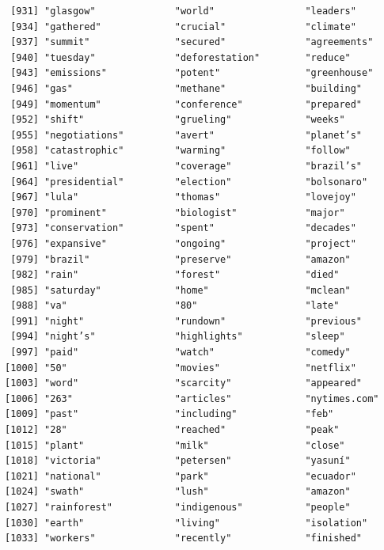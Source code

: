 \documentclass[
  letterpaper,
  DIV=11,
  numbers=noendperiod]{scrartcl}
\begin{document}
\begin{verbatim}
 [931] "glasgow"              "world"                "leaders"             
 [934] "gathered"             "crucial"              "climate"             
 [937] "summit"               "secured"              "agreements"          
 [940] "tuesday"              "deforestation"        "reduce"              
 [943] "emissions"            "potent"               "greenhouse"          
 [946] "gas"                  "methane"              "building"            
 [949] "momentum"             "conference"           "prepared"            
 [952] "shift"                "grueling"             "weeks"               
 [955] "negotiations"         "avert"                "planet’s"            
 [958] "catastrophic"         "warming"              "follow"              
 [961] "live"                 "coverage"             "brazil’s"            
 [964] "presidential"         "election"             "bolsonaro"           
 [967] "lula"                 "thomas"               "lovejoy"             
 [970] "prominent"            "biologist"            "major"               
 [973] "conservation"         "spent"                "decades"             
 [976] "expansive"            "ongoing"              "project"             
 [979] "brazil"               "preserve"             "amazon"              
 [982] "rain"                 "forest"               "died"                
 [985] "saturday"             "home"                 "mclean"              
 [988] "va"                   "80"                   "late"                
 [991] "night"                "rundown"              "previous"            
 [994] "night’s"              "highlights"           "sleep"               
 [997] "paid"                 "watch"                "comedy"              
[1000] "50"                   "movies"               "netflix"             
[1003] "word"                 "scarcity"             "appeared"            
[1006] "263"                  "articles"             "nytimes.com"         
[1009] "past"                 "including"            "feb"                 
[1012] "28"                   "reached"              "peak"                
[1015] "plant"                "milk"                 "close"               
[1018] "victoria"             "petersen"             "yasuní"              
[1021] "national"             "park"                 "ecuador"             
[1024] "swath"                "lush"                 "amazon"              
[1027] "rainforest"           "indigenous"           "people"              
[1030] "earth"                "living"               "isolation"           
[1033] "workers"              "recently"             "finished"            

\end{verbatim}
\end{document}
